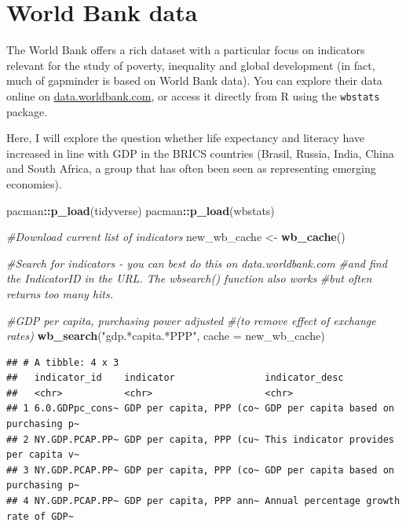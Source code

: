 \documentclass[
]{book}
\newenvironment{Shaded}{\begin{snugshade}}{\end{snugshade}}
\newcommand{\CommentTok}[1]{\textcolor[rgb]{0.56,0.35,0.01}{\textit{#1}}}
\newcommand{\DataTypeTok}[1]{\textcolor[rgb]{0.13,0.29,0.53}{#1}}
\newcommand{\KeywordTok}[1]{\textcolor[rgb]{0.13,0.29,0.53}{\textbf{#1}}}
\newcommand{\NormalTok}[1]{#1}
\newcommand{\OperatorTok}[1]{\textcolor[rgb]{0.81,0.36,0.00}{\textbf{#1}}}
\newcommand{\StringTok}[1]{\textcolor[rgb]{0.31,0.60,0.02}{#1}}
\begin{document}
\hypertarget{world-bank-data}{%
\section{World Bank data}\label{world-bank-data}}

The World Bank offers a rich dataset with a particular focus on indicators relevant for the study of poverty, inequality and global development (in fact, much of gapminder is based on World Bank data). You can explore their data online on \href{https://data.worldbank.com}{data.worldbank.com}, or access it directly from R using the \texttt{wbstats} package.

Here, I will explore the question whether life expectancy and literacy have increased in line with GDP in the BRICS countries (Brasil, Russia, India, China and South Africa, a group that has often been seen as representing emerging economies).

\begin{Shaded}
\begin{Highlighting}[]
\NormalTok{pacman}\OperatorTok{::}\KeywordTok{p_load}\NormalTok{(tidyverse)}
\NormalTok{pacman}\OperatorTok{::}\KeywordTok{p_load}\NormalTok{(wbstats)}
\end{Highlighting}
\end{Shaded}

\begin{Shaded}
\begin{Highlighting}[]
\CommentTok{#Download current list of indicators}
\NormalTok{new_wb_cache <-}\StringTok{ }\KeywordTok{wb_cache}\NormalTok{()}

\CommentTok{#Search for indicators - you can best do this on data.worldbank.com }
\CommentTok{#and find the IndicatorID in the URL. The wbsearch() function also works}
\CommentTok{#but often returns too many hits.}

\CommentTok{#GDP per capita, purchasing power adjusted }
\CommentTok{#(to remove effect of exchange rates)}
\KeywordTok{wb_search}\NormalTok{(}\StringTok{"gdp.*capita.*PPP"}\NormalTok{, }\DataTypeTok{cache =}\NormalTok{ new_wb_cache)}
\end{Highlighting}
\end{Shaded}

\begin{verbatim}
## # A tibble: 4 x 3
##   indicator_id    indicator                indicator_desc                       
##   <chr>           <chr>                    <chr>                                
## 1 6.0.GDPpc_cons~ GDP per capita, PPP (co~ GDP per capita based on purchasing p~
## 2 NY.GDP.PCAP.PP~ GDP per capita, PPP (cu~ This indicator provides per capita v~
## 3 NY.GDP.PCAP.PP~ GDP per capita, PPP (co~ GDP per capita based on purchasing p~
## 4 NY.GDP.PCAP.PP~ GDP per capita, PPP ann~ Annual percentage growth rate of GDP~
\end{verbatim}
\end{document}
